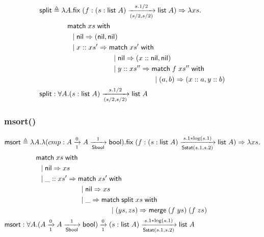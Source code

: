 \documentclass{article}
\newcommand{\arrow}[4]{#1\xrightarrow[#3]{#2}#4}
\newcommand{\symmatch}{\mathsf{match}}
\newcommand{\symwith}{\mathsf{\;with\;}}
\newcommand{\symlist}{\mathsf{list}}
\newcommand{\symnil}{\mathsf{nil}}
\newcommand{\symfix}{\mathsf{fix}}
\newcommand{\symbool}{\mathsf{bool}}
\newcommand{\symmerge}{\mathsf{merge}}
\newcommand{\intro}[2]{(#1 : #2)}
\newcommand{\symSbool}{\mathsf{Sbool}}
\newcommand{\symmsort}{\mathsf{msort}}
\newcommand{\symSstat}{\mathsf{Sstat}}
\newcommand{\symsplit}{\mathsf{split}}
\newcommand{\defeq}{\triangleq}
\begin{document}
\begin{align*}
\symsplit &\defeq \lambda A. \symfix\;(f:\arrow{\intro{s}{\symlist\;A}}{s.1/2}{(s/2,s/2)}{\symlist\;A})\Rightarrow\lambda xs. \\
& \hspace{0.3in} \symmatch\;xs\symwith \\
& \hspace{.4in} |\; \symnil\Rightarrow (\symnil,\symnil) \\
& \hspace{.4in} |\; x::xs' \Rightarrow \symmatch\;xs'\symwith \\
& \hspace{1.2in} |\; \symnil\Rightarrow (x::\symnil,\symnil) \\
& \hspace{1.2in} |\; y::xs'' \Rightarrow \symmatch\; f\;xs'' \symwith \\
& \hspace{2in} |\; (a, b) \Rightarrow (x::a,y::b) \\
\symsplit &: \forall A.\arrow{\intro{s}{\symlist\;A}}{s.1/2}{(s/2,s/2)}{\symlist\;A}
\end{align*}

\subsubsection{msort()}

\begin{align*}
\symmsort &\defeq \lambda A. \lambda (cmp:\arrow{A}{0}{1}{\arrow{A}{1}{\symSbool}{\symbool}}).\symfix\;(f:\arrow{\intro{s}{\symlist\;A}}{s.1*\log(s.1)}{\symSstat(s.1,s.2)}{\symlist\;A})\Rightarrow\lambda xs. \\
& \hspace{0.3in} \symmatch\;xs\symwith \\
& \hspace{.4in} |\; \symnil\Rightarrow xs \\
& \hspace{.4in} |\; \_::xs' \Rightarrow \symmatch\;xs'\symwith \\
& \hspace{1.2in} |\; \symnil\Rightarrow xs \\
& \hspace{1.2in} |\; \_ \Rightarrow \symmatch\; \symsplit\;xs \symwith \\
& \hspace{1.8in} |\; (ys, zs) \Rightarrow \symmerge\;(f\;ys)\;(f\;zs) \\
\symmsort &: \forall A.\arrow{(\arrow{A}{0}{1}{\arrow{A}{1}{\symSbool}{\symbool}})}{0}{1}{\arrow{\intro{s}{\symlist\;A}}{s.1*\log(s.1)}{\symSstat(s.1,s.2)}{\symlist\;A}}
\end{align*}
\end{document}
